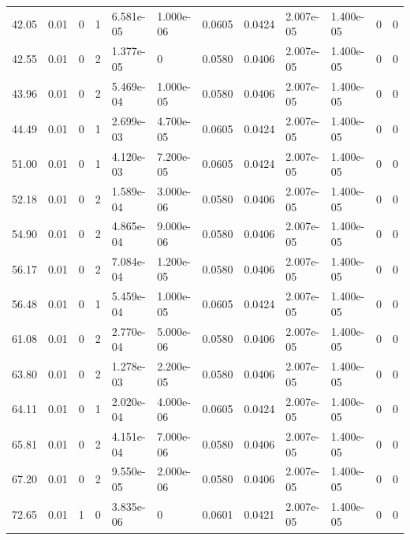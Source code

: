 \documentclass[preview]{standalone}
\begin{document}
{{\begin{tabular}{L{1.2cm}C{1.2cm} C{0.3cm}C{0.5cm} C{1.4cm}C{1.4cm} C{1.4cm}C{1.4cm} C{1.6cm}C{1.6cm} C{1.6cm}C{1.6cm}}
  42.05  &  0.01  & 0     &  1 &  6.581e-05  & 1.000e-06  &  0.0605&   0.0424& 2.007e-05 & 1.400e-05   &  0 & 0  \\ 
  42.55  &  0.01  & 0     &  2 &  1.377e-05  & 0  &  0.0580&   0.0406& 2.007e-05 & 1.400e-05   &  0 & 0  \\ 
  43.96  &  0.01  & 0     &  2 &  5.469e-04  & 1.000e-05  &  0.0580&   0.0406& 2.007e-05 & 1.400e-05   &  0 & 0  \\ 
  44.49  &  0.01  & 0     &  1 &  2.699e-03  & 4.700e-05  &  0.0605&   0.0424& 2.007e-05 & 1.400e-05   &  0 & 0  \\ 
  51.00  &  0.01  & 0     &  1 &  4.120e-03  & 7.200e-05  &  0.0605&   0.0424& 2.007e-05 & 1.400e-05   &  0 & 0  \\ 
  52.18  &  0.01  & 0     &  2 &  1.589e-04  & 3.000e-06  &  0.0580&   0.0406& 2.007e-05 & 1.400e-05   &  0 & 0  \\ 
  54.90  &  0.01  & 0     &  2 &  4.865e-04  & 9.000e-06  &  0.0580&   0.0406& 2.007e-05 & 1.400e-05   &  0 & 0  \\ 
  56.17  &  0.01  & 0     &  2 &  7.084e-04  & 1.200e-05  &  0.0580&   0.0406& 2.007e-05 & 1.400e-05   &  0 & 0  \\ 
  56.48  &  0.01  & 0     &  1 &  5.459e-04  & 1.000e-05  &  0.0605&   0.0424& 2.007e-05 & 1.400e-05   &  0 & 0  \\ 
  61.08  &  0.01  & 0     &  2 &  2.770e-04  & 5.000e-06  &  0.0580&   0.0406& 2.007e-05 & 1.400e-05   &  0 & 0  \\ 
  63.80  &  0.01  & 0     &  2 &  1.278e-03  & 2.200e-05  &  0.0580&   0.0406& 2.007e-05 & 1.400e-05   &  0 & 0  \\ 
  64.11  &  0.01  & 0     &  1 &  2.020e-04  & 4.000e-06  &  0.0605&   0.0424& 2.007e-05 & 1.400e-05   &  0 & 0  \\ 
  65.81  &  0.01  & 0     &  2 &  4.151e-04  & 7.000e-06  &  0.0580&   0.0406& 2.007e-05 & 1.400e-05   &  0 & 0  \\ 
  67.20  &  0.01  & 0     &  2 &  9.550e-05  & 2.000e-06  &  0.0580&   0.0406& 2.007e-05 & 1.400e-05   &  0 & 0  \\ 
  72.65  &  0.01  & 1     &  0 &  3.835e-06  & 0  &  0.0601&   0.0421& 2.007e-05 & 1.400e-05   &  0 & 0  \\ 
\hline 
\end{tabular} 

}}
\end{document}
